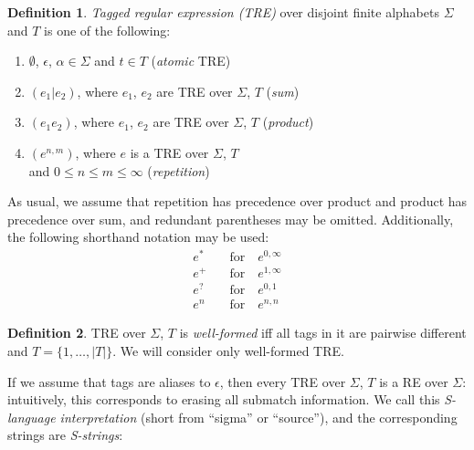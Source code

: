 \documentclass{article}
\newcommand{\Xin}{\!\in\!}
\newcommand{\Xeq}{\!=\!}
\theoremstyle{definition}
\newtheorem{Xdef}{Definition}
\begin{document}
\begin{multicols}{2}
    \begin{Xdef}\label{tre}
    \emph{Tagged regular expression (TRE)} over disjoint finite alphabets $\Sigma$ and $T$ is one of the following:
    \begin{enumerate}
        \medskip
        \item[] $\emptyset$, $\epsilon$, $\alpha \Xin \Sigma$ and $t \Xin T$ (\emph{atomic} TRE)
        \item[] $(e_1 | e_2)$, where $e_1$, $e_2$ are TRE over $\Sigma$, $T$ (\emph{sum})
        \item[] $(e_1 e_2)$,   where $e_1$, $e_2$ are TRE over $\Sigma$, $T$ (\emph{product})
        \item[] $(e^{n,m})$,   where $e$ is a TRE over $\Sigma$, $T$ \\
            \hphantom{\qquad} and $0 \!\leq\! n \!\leq\! m \!\leq\! \infty$ (\emph{repetition})
        \medskip
    \end{enumerate}
    \end{Xdef}

    As usual, we assume that repetition has precedence over product and product has precedence over sum,
    and redundant parentheses may be omitted.
    Additionally, the following shorthand notation may be used:
    \begin{align*}
        e^*     &\quad\text{for}\quad e^{0,\infty} \\[-0.5em]
        e^+     &\quad\text{for}\quad e^{1,\infty} \\[-0.5em]
        e^?     &\quad\text{for}\quad e^{0,1} \\[-0.5em]
        e^n     &\quad\text{for}\quad e^{n,n}
    \end{align*}

    \begin{Xdef}
    TRE over $\Sigma$, $T$ is \emph{well-formed} iff
    all tags in it are pairwise different
    and $T \Xeq \{ 1, \dots, |T| \}$.
    We will consider only well-formed TRE.
    \end{Xdef}

If we assume that tags are aliases to $\epsilon$, then every TRE over $\Sigma$, $T$ is a RE over $\Sigma$:
intuitively, this corresponds to erasing all submatch information. 
We call this \emph{S-language interpretation} (short from ``sigma'' or ``source''),
and the corresponding strings are \emph{S-strings}:


\end{multicols}
\end{document}
